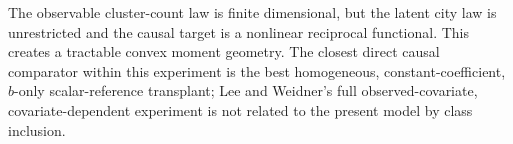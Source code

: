 The observable cluster-count law is finite dimensional, but the latent city law is unrestricted and the causal target is a nonlinear reciprocal functional. This creates a tractable convex moment geometry. The closest direct causal comparator within this experiment is the best homogeneous, constant-coefficient, \(b\)-only scalar-reference transplant; Lee and Weidner's full observed-covariate, covariate-dependent experiment is not related to the present model by class inclusion.